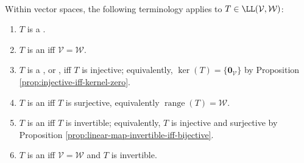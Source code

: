 \begin{definition} \label{def:linear-map-morphism-terminology-vector-spaces} \\
Within vector spaces, the following terminology applies to $T\in\LL(\mathcal{V},\mathcal{W})$:
\begin{enumerate}[label=(\roman*)]
\setlength{\itemsep}{0pt}
\item $T$ is a .
\item $T$ is an  iff $\mathcal{V}=\mathcal{W}$.
\item $T$ is a , or , iff $T$ is injective; equivalently, $\ker(T)=\{\mathbf{0}_{\mathcal{V}}\}$ by Proposition \ref{prop:injective-iff-kernel-zero}.
\item $T$ is an  iff $T$ is surjective, equivalently $\operatorname{range}(T)=\mathcal{W}$.
\item $T$ is an  iff $T$ is invertible; equivalently, $T$ is injective and surjective by Proposition \ref{prop:linear-map-invertible-iff-bijective}.
\item $T$ is an  iff $\mathcal{V}=\mathcal{W}$ and $T$ is invertible.
\end{enumerate}
\end{definition}
